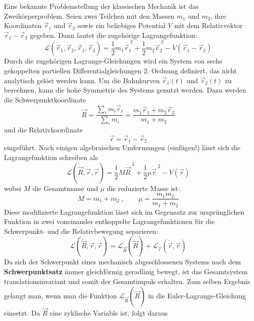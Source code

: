 \documentclass[9pt]{report}
\begin{document}
Eine bekannte Problemstellung der klassischen Mechanik ist das Zweikörperproblem. Seien zwei Teilchen mit den Massen $m_1$ und $m_2$, ihre Koordinaten $\vec{r}_1$ und $\vec{r}_2$ sowie ein beliebiges Potential $V$ mit dem Relativvektor $\vec{r}_1-\vec{r}_2$ gegeben. Dann lautet die zugehörige Lagrangefunktion:
\begin{equation}
\mathcal{L}(\dot{\vec{r}}_1,\dot{\vec{r}}_2,\vec{r}_1,\vec{r}_2)=\frac{1}{2}m_1\dot{\vec{r}}_{1}^{\;2}+\frac{1}{2}m_2\dot{\vec{r}}_{2}^{\;2}-V(\vec{r}_1-\vec{r}_2)
\end{equation}
Durch die zugehörigen Lagrange-Gleichungen wird ein System von sechs gekoppelten partiellen Differentialgleichungen 2. Ordnung definiert, das nicht analytisch gelöst werden kann. Um die Bahnkurven $\vec{r}_1(t)$ und $\vec{r}_2(t)$ zu berechnen, kann die hohe Symmetrie des Systems genutzt werden. Dazu werden die Schwerpunktkoordinate
\begin{equation}
\vec{R}=\frac{\sum_{i}m_i\vec{r}_i}{\sum_{i}m_i}=\frac{m_1\vec{r}_1+m_2\vec{r}_2}{m_1+m_2}
\end{equation}
und die Relativkoordinate
\begin{equation}
\vec{r}=\vec{r}_1-\vec{r}_2
\end{equation}
eingeführt. Nach einigen algebraischen Umformungen (einfügen!) lässt sich die Lagrangefunktion schreiben als
\begin{equation}
\mathcal{L}(\dot{\vec{R}},\dot{\vec{r}},\vec{r})=\frac{1}{2}M\dot{\vec{R}}^{\;2}+\frac{1}{2}\mu\dot{\vec{r}}^{\;2}-V(\vec{r})
\end{equation}
wobei $M$ die Gesamtmasse und $\mu$ die reduzierte Masse ist:
\begin{equation}
M=m_1+m_2\;,\qquad\mu=\frac{m_1 m_2}{m_1+m_2}
\end{equation}
Diese modifizierte Lagrangefunktion lässt sich im Gegensatz zur ursprünglichen Funktion in zwei voneinander entkoppelte Lagrangefunktionen für die Schwerpunkt- und die Relativbewegung separieren:
\begin{equation}
\mathcal{L}(\dot{\vec{R}},\dot{\vec{r}},\vec{r})=\mathcal{L}_{\vec{R}}(\dot{\vec{R}})+\mathcal{L}_{\vec{r}}(\dot{\vec{r}},\vec{r})
\end{equation}
Da sich der Schwerpunkt eines mechanisch abgeschlossenen Systems nach dem \textbf{Schwerpunktsatz} immer gleichförmig geradlinig bewegt, ist das Gesamtsystem translationsinvariant und somit der Gesamtimpuls erhalten. Zum selben Ergebnis gelangt man, wenn man die Funktion $\mathcal{L}_{\vec{R}}(\dot{\vec{R}})$ in die Euler-Lagrange-Gleichung einsetzt. Da $\vec{R}$ eine zyklische Variable ist, folgt daraus
\end{document}

